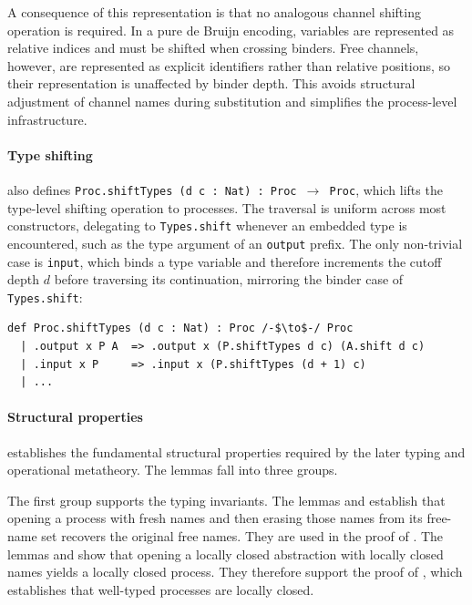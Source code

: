 A consequence of this representation is that no analogous channel shifting operation is required. In a pure de Bruijn encoding, variables are represented as relative indices and must be shifted when crossing binders. Free channels, however, are represented as explicit identifiers rather than relative positions, so their representation is unaffected by binder depth. This avoids structural adjustment of channel names during substitution and simplifies the process-level infrastructure.

\paragraph{Type shifting}
 also defines \texttt{Proc.shiftTypes (d c~: Nat)~: Proc $\to$ Proc}, which lifts the type-level shifting operation to processes. The traversal is uniform across most constructors, delegating to \texttt{Types.shift} whenever an embedded type is encountered, such as the type argument of an \texttt{output} prefix. The only non-trivial case is \texttt{input}, which binds a type variable and therefore increments the cutoff depth $d$ before traversing its continuation, mirroring the binder case of \texttt{Types.shift}:

\begin{lstlisting}[language=Lean4]
def Proc.shiftTypes (d c : Nat) : Proc /-$\to$-/ Proc
  | .output x P A  => .output x (P.shiftTypes d c) (A.shift d c)
  | .input x P     => .input x (P.shiftTypes (d + 1) c)
  | ...
\end{lstlisting}

\paragraph{Structural properties}
 establishes the fundamental structural properties required by the later typing and operational metatheory. The lemmas fall into three groups.

The first group supports the typing invariants. The lemmas  and  establish that opening a process with fresh names and then erasing those names from its free-name set recovers the original free names. They are used in the proof of . The lemmas  and  show that opening a locally closed abstraction with locally closed names yields a locally closed process. They therefore support the proof of , which establishes that well-typed processes are locally closed.

